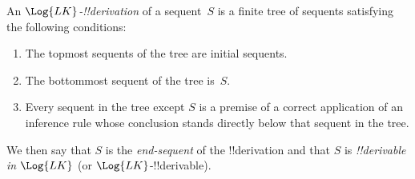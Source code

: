 \begin{defn}
An \emph{$\Log{LK}$-!!{derivation}} of a sequent~$S$ is a finite tree
of sequents satisfying the following conditions:
\begin{enumerate}
\item The topmost sequents of the tree are initial sequents.
\item The bottommost sequent of the tree is~$S$.
\item Every sequent in the tree except $S$ is a premise of a correct
  application of an inference rule whose conclusion stands directly
  below that sequent in the tree.
\end{enumerate}
We then say that $S$ is the \emph{end-sequent} of the !!{derivation} and
that $S$ is \emph{!!{derivable} in $\Log{LK}$} (or $\Log{LK}$-!!{derivable}).
\end{defn}

